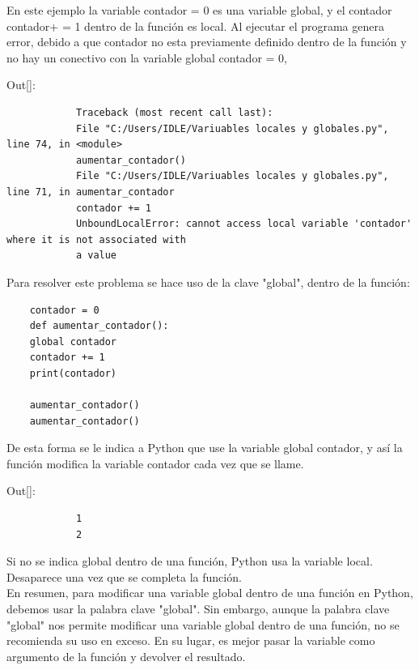 En este ejemplo la variable {\ttfamily contador = 0} es una  variable global, y el contador 
{\ttfamily contador+ = 1} dentro de la función es local. Al ejecutar el programa genera error, debido a que {\ttfamily contador} no esta previamente definido dentro de la función y no hay un conectivo con la variable global {\ttfamily contador = 0},\vspace{0.08cm}

{\ttfamily\scriptsize\noindent Out[]: \vspace{-0.3cm}	
	{\color{red} 	
		\begin{verbatim}
			Traceback (most recent call last):
			File "C:/Users/IDLE/Variuables locales y globales.py", line 74, in <module>
			aumentar_contador()
			File "C:/Users/IDLE/Variuables locales y globales.py", line 71, in aumentar_contador
			contador += 1
			UnboundLocalError: cannot access local variable 'contador' where it is not associated with
			a value		
		\end{verbatim}
}}


Para resolver este problema se hace uso de la clave {\ttfamily {}"{}global{}"{}}, dentro de la función:

\hspace{-2.6cm}{\ttfamily \scriptsize contador.py}\vspace{-0.5cm}	
\begin{lstlisting}
	contador = 0
	def aumentar_contador():
	global contador
	contador += 1
	print(contador)
	
	aumentar_contador()
	aumentar_contador()
\end{lstlisting}

De esta forma se le indica a Python que use la variable {\ttfamily global contador}, y así la función modifica   
la variable contador cada vez que se llame.\vspace{0.08cm}

{\ttfamily\scriptsize \noindent Out[]:\vspace{-0.3cm}	
	{\color{blue} 	
		\begin{verbatim}
			1
			2			
		\end{verbatim}
}}
Si no se indica  {\ttfamily global} dentro de una función, Python usa  la variable  local. Desaparece una vez que se completa la función.\\


En resumen, para modificar una variable global dentro de una función en Python, debemos usar la palabra clave {\ttfamily {}"{}global{}"{}}. Sin embargo, aunque la palabra clave  {\ttfamily {}"{}global{}"{}} nos permite modificar una variable global dentro de una función, no se recomienda su uso en exceso. En su lugar, es mejor pasar la variable como argumento de la función y devolver el resultado.\\


